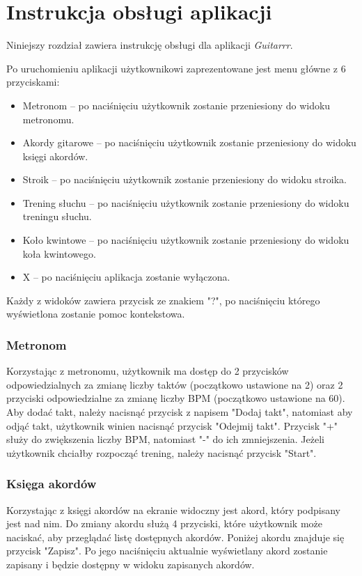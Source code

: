 \chapter{Instrukcja obsługi aplikacji}

Niniejszy rozdział zawiera instrukcję obsługi dla aplikacji \emph{Guitarrr}. 

Po uruchomieniu aplikacji użytkownikowi zaprezentowane jest menu główne z 6 przyciskami:

\begin{itemize}
    \item Metronom -- po naciśnięciu użytkownik zostanie przeniesiony do widoku metronomu.
    \item Akordy gitarowe -- po naciśnięciu użytkownik zostanie przeniesiony do widoku księgi akordów.
    \item Stroik -- po naciśnięciu użytkownik zostanie przeniesiony do widoku stroika.
    \item Trening słuchu -- po naciśnięciu użytkownik zostanie przeniesiony do widoku treningu słuchu.
    \item Koło kwintowe -- po naciśnięciu użytkownik zostanie przeniesiony do widoku koła kwintowego.
    \item X -- po naciśnięciu aplikacja zostanie wyłączona.
\end{itemize}

Każdy z widoków zawiera przycisk ze znakiem "?", po naciśnięciu którego wyświetlona zostanie pomoc kontekstowa.

\subsection{Metronom}

Korzystając z metronomu, użytkownik ma dostęp do 2 przycisków odpowiedzialnych za zmianę liczby taktów (początkowo ustawione na 2) oraz 2 przyciski odpowiedzialne za zmianę liczby BPM (początkowo ustawione na 60). Aby dodać takt, należy nacisnąć przycisk z napisem "Dodaj takt", natomiast aby odjąć takt, użytkownik winien nacisnąć przycisk "Odejmij takt". Przycisk "+" służy do zwiększenia liczby BPM, natomiast "-" do ich zmniejszenia. Jeżeli użytkownik chciałby rozpocząć trening, należy nacisnąć przycisk "Start".
\subsection{Księga akordów}

Korzystając z księgi akordów na ekranie widoczny jest akord, który podpisany jest nad nim. Do zmiany akordu służą 4 przyciski, które użytkownik może naciskać, aby przeglądać listę dostępnych akordów. Poniżej akordu znajduje się przycisk "Zapisz". Po jego naciśnięciu aktualnie wyświetlany akord zostanie zapisany i będzie dostępny w widoku zapisanych akordów.
